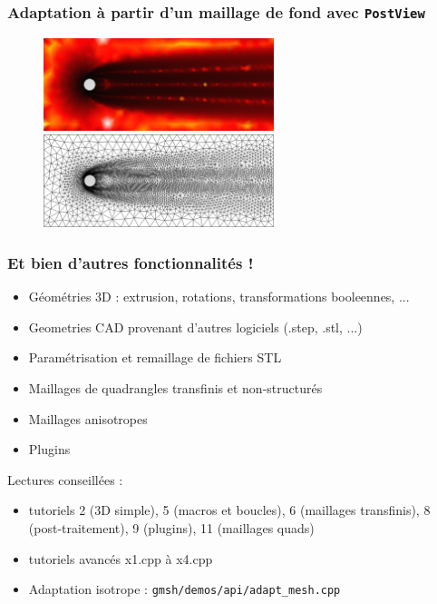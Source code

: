 \documentclass[aspectratio=169]{beamer}
\begin{document}
\begin{frame}[fragile]
\frametitle{Adaptation à partir d'un maillage de fond avec \texttt{PostView}}
\begin{figure}
  \includegraphics[width=0.6\textwidth]{figures/sizefield.png}

  \vspace{0.3cm}

  \includegraphics[width=0.6\textwidth]{figures/adapted.png}
  \caption{}
\end{figure}
\end{frame}

\begin{frame}[fragile]
\frametitle{Et bien d'autres fonctionnalités !}
\begin{itemize}
  \item Géométries 3D : extrusion, rotations, transformations booleennes, ...
  \item Geometries CAD provenant d'autres logiciels (.step, .stl, ...)
  \item Paramétrisation et remaillage de fichiers STL
  \item Maillages de quadrangles transfinis et non-structurés
  \item Maillages anisotropes
  \item Plugins
\end{itemize}
Lectures conseillées :
\begin{itemize}
  \item tutoriels 2 (3D simple), 5 (macros et boucles), 6 (maillages transfinis), 8 (post-traitement), 9 (plugins), 11 (maillages quads)
  \item tutoriels avancés x1.cpp à x4.cpp
  \item Adaptation isotrope : \texttt{gmsh/demos/api/adapt\_mesh.cpp}
\end{itemize}
\end{frame}
\end{document}
